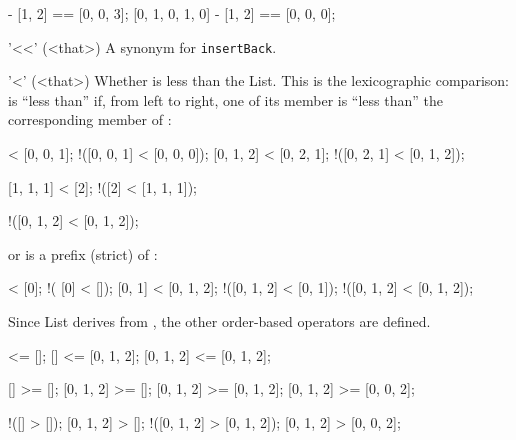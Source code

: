 \begin{urbiscriptapi}
\begin{urbiassert}
[0, 1, 0, 2, 3] - [1, 2] == [0, 0, 3];
[0, 1, 0, 1, 0] - [1, 2] == [0, 0, 0];
\end{urbiassert}

\item['<<'](<that>)%
  A synonym for \lstinline|insertBack|.

\item['<'](<that>)%
  Whether \this is less than the \that List.  This is the lexicographic
  comparison: \this is ``less than'' \that if, from left to right, one of
  its member is ``less than'' the corresponding member of \that:

\begin{urbiassert}
  [0, 0, 0] < [0, 0, 1];    !([0, 0, 1] < [0, 0, 0]);
  [0, 1, 2] < [0, 2, 1];    !([0, 2, 1] < [0, 1, 2]);

  [1, 1, 1] < [2];          !([2] < [1, 1, 1]);

 !([0, 1, 2] < [0, 1, 2]);
\end{urbiassert}

  \noindent
  or \that is a prefix (strict) of \this:

\begin{urbiassert}
           [] < [0];          !(      [0] < []);
       [0, 1] < [0, 1, 2];    !([0, 1, 2] < [0, 1]);
  !([0, 1, 2] < [0, 1, 2]);
\end{urbiassert}

  Since List derives from , the other order-based
  operators are defined.

\begin{urbiassert}
        [] <= [];
        [] <= [0, 1, 2];
 [0, 1, 2] <= [0, 1, 2];

        [] >= [];
 [0, 1, 2] >= [];
 [0, 1, 2] >= [0, 1, 2];
 [0, 1, 2] >= [0, 0, 2];

       !([] > []);
  [0, 1, 2] > [];
!([0, 1, 2] > [0, 1, 2]);
  [0, 1, 2] > [0, 0, 2];
\end{urbiassert}
\end{urbiscriptapi}


